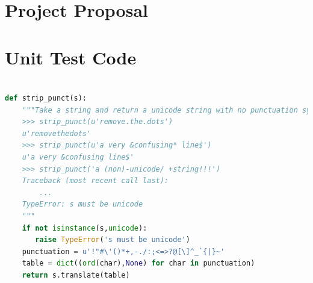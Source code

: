 \documentclass[12pt,a4paper,notitlepage,twoside]{scrbook}
\begin{document}


\appendix

\chapter{Project Proposal}
\label{prop}



\chapter{Unit Test Code}
\label{app:testing}
\begin{lstlisting}[language=python]

def strip_punct(s):
    """Take a string and return a unicode string with no punctuation symbols.
    >>> strip_punct(u'remove.the.dots')
    u'removethedots'
    >>> strip_punct(u'a very &confusing* line$')
    u'a very &confusing line$'
    >>> strip_punct('a (non)-unicode/ +string!!!')
    Traceback (most recent call last):
        ...
    TypeError: s must be unicode
    """
    if not isinstance(s,unicode):
       raise TypeError('s must be unicode')
    punctuation = u'!"#\'()*+,-./:;<=>?@[\]^_`{|}~'
    table = dict((ord(char),None) for char in punctuation)
    return s.translate(table)

\end{lstlisting}
\end{document}
